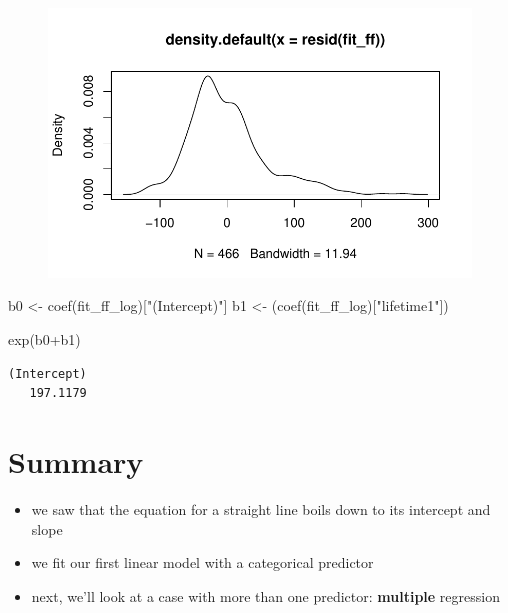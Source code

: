 \documentclass[
  letterpaper,
  DIV=11,
  numbers=noendperiod]{scrartcl}
\newenvironment{Shaded}{\begin{snugshade}}{\end{snugshade}}
\newcommand{\FunctionTok}[1]{\textcolor[rgb]{0.28,0.35,0.67}{#1}}
\newcommand{\NormalTok}[1]{\textcolor[rgb]{0.00,0.23,0.31}{#1}}
\newcommand{\OtherTok}[1]{\textcolor[rgb]{0.00,0.23,0.31}{#1}}
\newcommand{\SpecialCharTok}[1]{\textcolor[rgb]{0.37,0.37,0.37}{#1}}
\newcommand{\StringTok}[1]{\textcolor[rgb]{0.13,0.47,0.30}{#1}}
\begin{document}
\begin{figure}[H]

{\centering \includegraphics{_lin_reg1_files/figure-pdf/unnamed-chunk-40-1.pdf}

}

\end{figure}

\begin{Shaded}
\begin{Highlighting}[]
\NormalTok{b0 }\OtherTok{\textless{}{-}} \FunctionTok{coef}\NormalTok{(fit\_ff\_log)[}\StringTok{"(Intercept)"}\NormalTok{]}
\NormalTok{b1 }\OtherTok{\textless{}{-}}\NormalTok{ (}\FunctionTok{coef}\NormalTok{(fit\_ff\_log)[}\StringTok{"lifetime1"}\NormalTok{]) }

\FunctionTok{exp}\NormalTok{(b0}\SpecialCharTok{+}\NormalTok{b1)}
\end{Highlighting}
\end{Shaded}

\begin{verbatim}
(Intercept) 
   197.1179 
\end{verbatim}

\hypertarget{summary-1}{%
\section{Summary}\label{summary-1}}

\begin{itemize}
\item
  we saw that the equation for a straight line boils down to its
  intercept and slope
\item
  we fit our first linear model with a categorical predictor
\item
  next, we'll look at a case with more than one predictor:
  \textbf{multiple} regression
\end{itemize}
\end{document}
